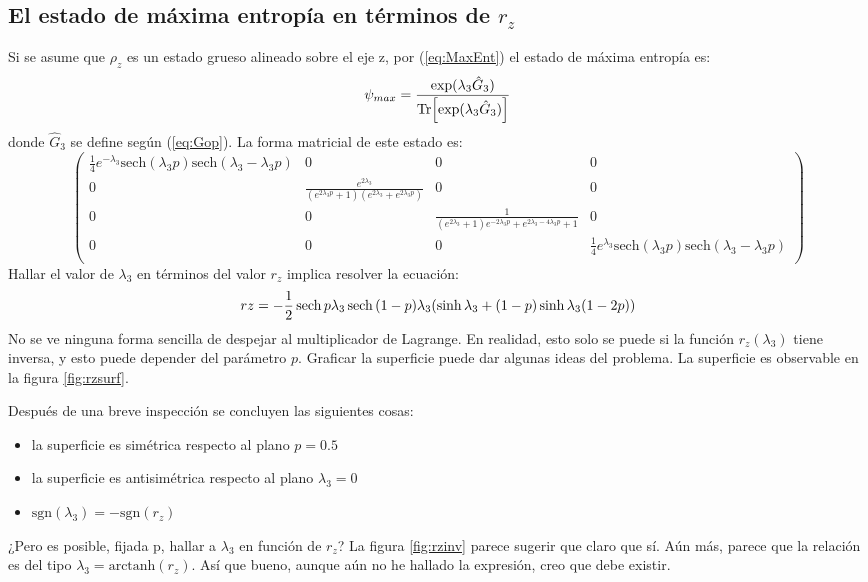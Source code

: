 \documentclass[onecolumn,11pt]{article}
\begin{document}
\subsection{El estado de máxima entropía en términos de $r_{z}$}
Si se asume que $\rho_{z}$ es un estado grueso alineado sobre el eje z, por (\ref{eq:MaxEnt}) el estado de máxima entropía es:
\begin{equation}\label{eq:MaxEntZ}
\psi_{max}=\frac{\text{exp}(\lambda_{3}\hat{G}_{3})}{\Tr[\text{exp}(\lambda_{3}\hat{G}_{3})]}
\end{equation}
donde $\hat{G}_{3}$ se define según (\ref{eq:Gop}). La forma matricial de este estado es:
\begin{equation*}
\left(
\begin{array}{cccc}
 \frac{1}{4} e^{-\lambda_{3}} \text{sech}(\lambda_{3} p)
   \text{sech}(\lambda_{3}-\lambda_{3} p) & 0 & 0 & 0 \\
 0 & \frac{e^{2 \lambda_{3}}}{\left(e^{2 \lambda_{3}
   p}+1\right) \left(e^{2 \lambda_{3}}+e^{2 \lambda_{3}
   p}\right)} & 0 & 0 \\
 0 & 0 & \frac{1}{\left(e^{2 \lambda_{3}}+1\right) e^{-2
   \lambda_{3} p}+e^{2 \lambda_{3}-4 \lambda_{3}
   p}+1} & 0 \\
 0 & 0 & 0 & \frac{1}{4} e^{\lambda_{3}}
   \text{sech}(\lambda_{3} p) \text{sech}(\lambda_{3}-\lambda_{3} p) \\
\end{array}
\right)
\end{equation*}
Hallar el valor de $\lambda_{
3}$ en términos del valor $r_{z}$ implica resolver la ecuación:
\begin{equation}\label{eq:RZ}
rz=-\frac{1}{2}\sech{p\lambda_{3}}\sech{(1-p)\lambda_{3}}(\sinh{\lambda_{3}}+(1-p)\sinh{\lambda_{3}(1-2p)})
\end{equation}
No se ve ninguna forma sencilla de despejar al multiplicador de Lagrange. En realidad, esto solo se puede si la función $r_{z}(\lambda_{3})$ tiene inversa, y esto puede depender del parámetro $p$. Graficar la superficie puede dar algunas ideas del problema. La superficie es observable en la figura \ref{fig:rzsurf}.

Después de una breve inspección se concluyen las siguientes cosas:
\begin{itemize}
\item la superficie es simétrica respecto al plano $p=0.5$
\item la superficie es antisimétrica respecto al plano $\lambda_{3}=0$
\item $\text{sgn}(\lambda_{3})=-\text{sgn}(r_{z})$
\end{itemize}
¿Pero es posible, fijada p, hallar a $\lambda_{3}$ en función de $r_{z}$? La figura \ref{fig:rzinv} parece sugerir que claro que sí. Aún más, parece que la relación es del tipo $\lambda_{3}=\text{arctanh}(r_{z})$. Así que bueno, aunque aún no he hallado la expresión, creo que debe existir.
\end{document}
